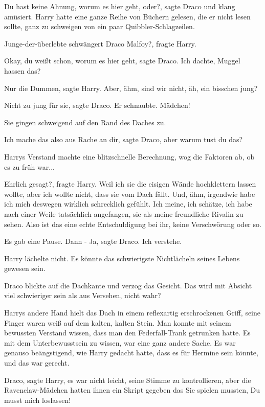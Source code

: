 \glqq{}Du hast keine Ahnung, worum es hier geht, oder?\grqq{}, sagte Draco und
klang amüsiert. Harry hatte eine ganze Reihe von Büchern gelesen, die er nicht
lesen sollte, ganz zu schweigen von ein paar Quibbler-Schlagzeilen.

\glqq{}Junge-der-überlebte schwängert Draco Malfoy?\grqq{}, fragte Harry.

\glqq{}Okay, du weißt schon, worum es hier geht\grqq{}, sagte Draco. \glqq{}Ich
dachte, Muggel hassen das?\grqq{}

\glqq{}Nur die Dummen\grqq{}, sagte Harry. \glqq{}Aber, ähm, sind wir nicht, äh,
ein bisschen jung?\grqq{}

\glqq{}Nicht zu jung für sie\grqq{}, sagte Draco. Er schnaubte. \glqq{}Mädchen!\grqq{}

Sie gingen schweigend auf den Rand des Daches zu.

\glqq{}Ich mache das also aus Rache an dir\grqq{}, sagte Draco, \glqq{}aber warum
tust du das?\grqq{}

Harrys Verstand machte eine blitzschnelle Berechnung, wog die Faktoren ab, ob es
zu früh war...

\glqq{}Ehrlich gesagt?\grqq{}, fragte Harry. \glqq{}Weil ich sie die eisigen Wände
hochklettern lassen wollte, aber ich wollte nicht, dass sie vom Dach fällt. Und,
ähm, irgendwie habe ich mich deswegen wirklich schrecklich gefühlt. Ich meine,
ich schätze, ich habe nach einer Weile tatsächlich angefangen, sie als meine
freundliche Rivalin zu sehen. Also ist das eine echte Entschuldigung bei ihr,
keine Verschwörung oder so.\grqq{}

Es gab eine Pause. Dann - \glqq{}Ja\grqq{}, sagte Draco. \glqq{}Ich verstehe.\grqq{}

Harry lächelte nicht. Es könnte das schwierigste Nichtlächeln seines Lebens
gewesen sein.

Draco blickte auf die Dachkante und verzog das Gesicht. \glqq{}Das wird mit
Absicht viel schwieriger sein als aus Versehen, nicht wahr?\grqq{}

Harrys andere Hand hielt das Dach in einem reflexartig erschrockenen Griff,
seine Finger waren weiß auf dem kalten, kalten Stein. Man konnte mit seinem
bewussten Verstand wissen, dass man den Federfall-Trank getrunken hatte. Es mit
dem Unterbewusstsein zu wissen, war eine ganz andere Sache. Es war genauso
beängstigend, wie Harry gedacht hatte, dass es für Hermine sein könnte, und das
war gerecht.

\glqq{}Draco\grqq{}, sagte Harry, es war nicht leicht, seine Stimme zu
kontrollieren, aber die Ravenclaw-Mädchen hatten ihnen ein Skript gegeben das
Sie spielen mussten, \glqq{}Du musst mich loslassen!\grqq{}

